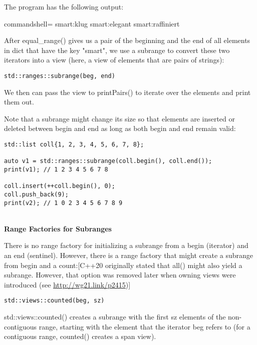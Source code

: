 The program has the following output:

{\footnotesize
\begin{tcblisting}{commandshell={}}
smart:klug smart:elegant smart:raffiniert
\end{tcblisting}
}

After equal\_range() gives us a pair of the beginning and the end of all elements in dict that have the key "smart", we use a subrange to convert these two iterators into a view (here, a view of elements that are pairs of strings):

\begin{lstlisting}[style=styleCXX]
std::ranges::subrange(beg, end)
\end{lstlisting}

We then can pass the view to printPairs() to iterate over the elements and print them out.

Note that a subrange might change its size so that elements are inserted or deleted between begin and end as long as both begin and end remain valid:

\begin{lstlisting}[style=styleCXX]
std::list coll{1, 2, 3, 4, 5, 6, 7, 8};

auto v1 = std::ranges::subrange(coll.begin(), coll.end());
print(v1); // 1 2 3 4 5 6 7 8

coll.insert(++coll.begin(), 0);
coll.push_back(9);
print(v2); // 1 0 2 3 4 5 6 7 8 9
\end{lstlisting}

\noindent
\hspace*{\fill} \\ %
\textbf{Range Factories for Subranges}

There is no range factory for initializing a subrange from a begin (iterator) and an end (sentinel). However, there is a range factory that might create a subrange from begin and a count:[C++20 originally stated that all() might also yield a subrange. However, that option was removed later when owning views were introduced (see \url{http://wg21.link/p2415})]

\begin{lstlisting}[style=styleCXX]
std::views::counted(beg, sz)
\end{lstlisting}

std::views::counted() creates a subrange with the first sz elements of the non-contiguous range, starting with the element that the iterator beg refers to (for a contiguous range, counted() creates a span view).

